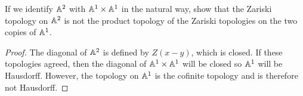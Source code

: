 \label{1.1.4}

If we identify $\mathbb A^2$ with $\mathbb A^1 \times \mathbb A^1$ in the natural way, show that the Zariski topology on $\mathbb A^2$ is not the product topology of the Zariski topologies on the two copies of $\mathbb A^1$.

\begin{proof}
    The diagonal of $\mathbb A^2$ is defined by $Z(x - y)$, which is closed. If these topologies agreed, then the diagonal of $\mathbb A^1 \times \mathbb A^1$ will be closed so $\mathbb A^1$ will be Hausdorff. However, the topology on $\mathbb A^1$ is the cofinite topology and is therefore not Hausdorff.
\end{proof}